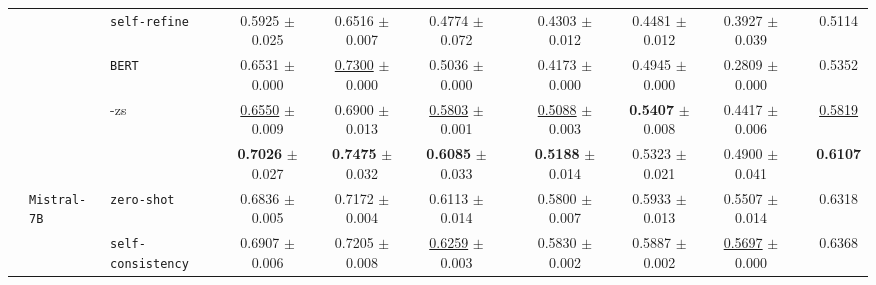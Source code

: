 \begin{table}[ht]
\begin{adjustbox}{max width=\textwidth}
\begin{tabular}{@{}l l l ccc p{0.15cm} ccc p{0.15cm} c@{}}
        & & \cellcolor{altrow} \texttt{self-refine}            & \cellcolor{altrow} 0.5925 {\tiny$\pm$ 0.025} & \cellcolor{altrow} 0.6516 {\tiny$\pm$ 0.007} & \cellcolor{altrow} 0.4774 {\tiny$\pm$ 0.072}  & & \cellcolor{altrow} 0.4303 {\tiny$\pm$ 0.012} & \cellcolor{altrow} 0.4481 {\tiny$\pm$ 0.012} & \cellcolor{altrow} 0.3927 {\tiny$\pm$ 0.039}  & & \cellcolor{avgall!85}0.5114 \\
        & & \cellcolor{white} \texttt{BERT}                   & \cellcolor{white} 0.6531 {\tiny$\pm$ 0.000} & \cellcolor{white} \underline{0.7300} {\tiny$\pm$ 0.000} & \cellcolor{white} 0.5036 {\tiny$\pm$ 0.000}  & & \cellcolor{white} 0.4173 {\tiny$\pm$ 0.000} & \cellcolor{white} 0.4945 {\tiny$\pm$ 0.000} & \cellcolor{white} 0.2809 {\tiny$\pm$ 0.000}  & & \cellcolor{avgall!85}0.5352 \\
        & & \cellcolor{methodrow} \method{}-zs          & \cellcolor{methodrow} \underline{0.6550} {\tiny$\pm$ 0.009} & \cellcolor{methodrow} 0.6900 {\tiny$\pm$ 0.013} & \cellcolor{methodrow} \underline{0.5803} {\tiny$\pm$ 0.001}  & & \cellcolor{methodrow} \underline{0.5088} {\tiny$\pm$ 0.003} & \cellcolor{methodrow} \textbf{0.5407} {\tiny$\pm$ 0.008} & \cellcolor{methodrow} 0.4417 {\tiny$\pm$ 0.006}  & & \cellcolor{avgall!85}\underline{0.5819} \\
        & & \cellcolor{methodrow} \method{}                    & \cellcolor{methodrow} \textbf{0.7026} {\tiny$\pm$ 0.027} & \cellcolor{methodrow} \textbf{0.7475} {\tiny$\pm$ 0.032} & \cellcolor{methodrow} \textbf{0.6085} {\tiny$\pm$ 0.033}  & & \cellcolor{methodrow} \textbf{0.5188} {\tiny$\pm$ 0.014} & \cellcolor{methodrow} 0.5323 {\tiny$\pm$ 0.021} & \cellcolor{methodrow} 0.4900 {\tiny$\pm$ 0.041}  & & \cellcolor{avgall!85}\textbf{0.6107} \\
        \cmidrule(lr){2-10}
        & \multirow{7}{*}{\texttt{Mistral-7B}}
          & \cellcolor{white} \texttt{zero-shot}               & \cellcolor{white} 0.6836 {\tiny$\pm$ 0.005} & \cellcolor{white} 0.7172 {\tiny$\pm$ 0.004} & \cellcolor{white} 0.6113 {\tiny$\pm$ 0.014}  & & \cellcolor{white} 0.5800 {\tiny$\pm$ 0.007} & \cellcolor{white} 0.5933 {\tiny$\pm$ 0.013} & \cellcolor{white} 0.5507 {\tiny$\pm$ 0.014}  & & \cellcolor{avgall!85}0.6318 \\
        & & \cellcolor{altrow} \texttt{self-consistency}       & \cellcolor{altrow} 0.6907 {\tiny$\pm$ 0.006} & \cellcolor{altrow} 0.7205 {\tiny$\pm$ 0.008} & \cellcolor{altrow} \underline{0.6259} {\tiny$\pm$ 0.003}  & & \cellcolor{altrow} 0.5830 {\tiny$\pm$ 0.002} & \cellcolor{altrow} 0.5887 {\tiny$\pm$ 0.002} & \cellcolor{altrow} \underline{0.5697} {\tiny$\pm$ 0.000}  & & \cellcolor{avgall!85}0.6368 \\

\end{tabular}
\end{adjustbox}
\end{table}
